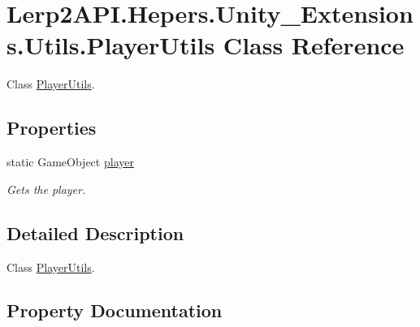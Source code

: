 \hypertarget{class_lerp2_a_p_i_1_1_hepers_1_1_unity___extensions_1_1_utils_1_1_player_utils}{}\section{Lerp2\+A\+P\+I.\+Hepers.\+Unity\+\_\+\+Extensions.\+Utils.\+Player\+Utils Class Reference}
\label{class_lerp2_a_p_i_1_1_hepers_1_1_unity___extensions_1_1_utils_1_1_player_utils}


Class \hyperlink{class_lerp2_a_p_i_1_1_hepers_1_1_unity___extensions_1_1_utils_1_1_player_utils}{Player\+Utils}.  


\subsection*{Properties}
\begin{DoxyCompactItemize}
\item 
static Game\+Object \hyperlink{class_lerp2_a_p_i_1_1_hepers_1_1_unity___extensions_1_1_utils_1_1_player_utils_ad219845d874a3f13bc079fe48208dce1}{player}
\begin{DoxyCompactList}\small\item\em Gets the player. \end{DoxyCompactList}\end{DoxyCompactItemize}


\subsection{Detailed Description}
Class \hyperlink{class_lerp2_a_p_i_1_1_hepers_1_1_unity___extensions_1_1_utils_1_1_player_utils}{Player\+Utils}. 



\subsection{Property Documentation}
\mbox{\label{class_lerp2_a_p_i_1_1_hepers_1_1_unity___extensions_1_1_utils_1_1_player_utils_ad219845d874a3f13bc079fe48208dce1}} 
